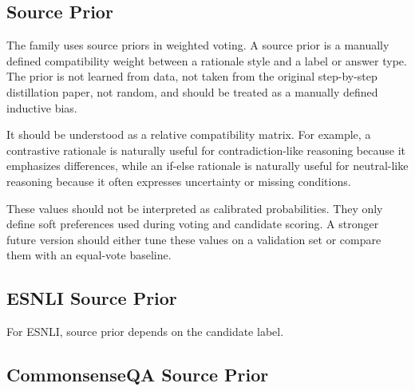 \documentclass[11pt]{article}
\newcommand{\dataset}[1]{\textsc{#1}}
\begin{document}
\subsection{Source Prior}

The family uses source priors in weighted voting. A source prior is a manually defined compatibility weight between a rationale style and a label or answer type. The prior is not learned from data, not taken from the original step-by-step distillation paper, not random, and should be treated as a manually defined inductive bias.

It should be understood as a relative compatibility matrix. For example, a contrastive rationale is naturally useful for contradiction-like reasoning because it emphasizes differences, while an if-else rationale is naturally useful for neutral-like reasoning because it often expresses uncertainty or missing conditions.

These values should not be interpreted as calibrated probabilities. They only define soft preferences used during voting and candidate scoring. A stronger future version should either tune these values on a validation set or compare them with an equal-vote baseline.

\subsection{ESNLI Source Prior}

For \dataset{ESNLI}, source prior depends on the candidate label.

\begin{table}[H]
\centering
\caption{\dataset{ESNLI} source prior values.}
\end{table}

\subsection{CommonsenseQA Source Prior}
\end{document}
